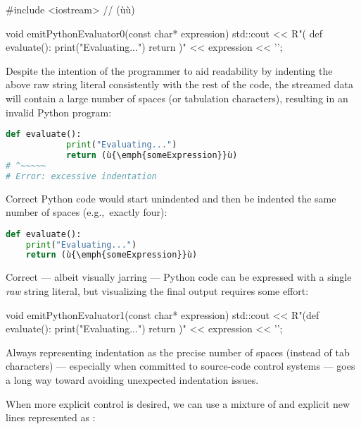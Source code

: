\begin{emcppshiddenlisting}[emcppsbatch={e2,e3,e4}]
#include <iostream>  // (ù{}ù)
\end{emcppshiddenlisting}
\begin{emcppslisting}[emcppsbatch=e2]
void emitPythonEvaluator0(const char* expression)
{
    std::cout << R"(
        def evaluate():
            print("Evaluating...")
            return )" << expression << '\n';
}
\end{emcppslisting}
    
\noindent Despite the intention of the programmer to aid readability by indenting
the above raw string literal consistently with the rest of the code, the
streamed data will contain a large number of spaces (or tabulation
characters), resulting in an invalid Python program:

\begin{lstlisting}[language=python]
        def evaluate():
            print("Evaluating...")
            return (ù{\emph{someExpression}}ù)
# ^~~~~~
# Error: excessive indentation
\end{lstlisting}
    
\noindent Correct Python code would start unindented and then be indented the same number
of spaces (e.g.,~exactly four):

\begin{lstlisting}[language=python]
def evaluate():
    print("Evaluating...")
    return (ù{\emph{someExpression}}ù)
\end{lstlisting}
    
\noindent Correct --- albeit visually jarring --- Python code can be expressed with a
single \emph{raw} string literal, but visualizing the final output requires some effort:

\begin{emcppslisting}[emcppsbatch=e3]
void emitPythonEvaluator1(const char* expression)
{
    std::cout << R"(def evaluate():
    print("Evaluating...")
    return )" << expression << '\n';
}
\end{emcppslisting}
    
\noindent Always
representing indentation as the precise number of spaces (instead of
tab characters) --- especially when committed to source-code control
  systems --- goes a long way toward avoiding unexpected indentation issues.

When more explicit control is desired, we can use a mixture of
 and explicit new lines represented as
:

